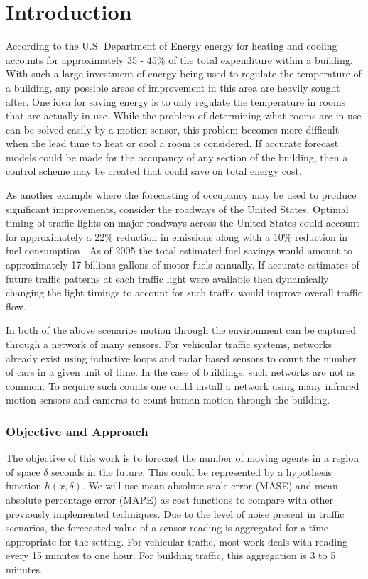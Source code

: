 \chapter{Introduction}
According to the U.S. Department of Energy \cite{DOE2010} energy for heating and cooling accounts for approximately 35 - 45\% of the total expenditure within a building.  With such a large investment of energy being used to regulate the temperature of a building, any possible areas of improvement in this area are heavily sought after.  One idea for saving energy is to only regulate the temperature in rooms that are actually in use.  While the problem of determining what rooms are in use can be solved easily by a motion sensor, this problem becomes more difficult when the lead time to heat or cool a room is considered.  If accurate forecast models could be made for the occupancy of any section of the building, then a control scheme may be created that could save on total energy cost.

As another example where the forecasting of occupancy may be used to produce significant improvements, consider the roadways of the United States.  Optimal timing of traffic lights on major roadways across the United States could account for approximately a 22\% reduction in emissions along with a 10\% reduction in fuel consumption \cite{DOT2007}.  As of 2005 the total estimated fuel savings would amount to approximately 17 billions gallons of motor fuels annually.  If accurate estimates of future traffic patterns at each traffic light were available then dynamically changing the light timings to account for such traffic would improve overall traffic flow.

In both of the above scenarios motion through the environment can be captured through a network of many sensors.  For vehicular traffic systems, networks already exist using inductive loops and radar based sensors to count the number of cars in a given unit of time.  In the case of buildings, such networks are not as common.  To acquire such counts one could install a network using many infrared motion sensors and cameras to count human motion through the building.  

\subsection{Objective and Approach}
The objective of this work is to forecast the number of moving agents in a region of space $\delta$ seconds in the future.  This could be represented by a hypothesis function $h(x, \delta)$.  We will use mean absolute scale error (MASE) \cite{Hyndman2006} and mean absolute percentage error (MAPE) as  cost functions to compare with other previously implemented techniques.  Due to the level of noise present in traffic scenarios, the forecasted value of a sensor reading is aggregated for a time appropriate for the setting.  For vehicular traffic, most work deals with reading every 15 minutes to one hour.  For building traffic, this aggregation is 3 to 5 minutes.  


